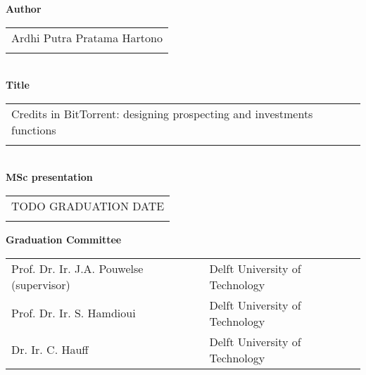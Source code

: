 \thispagestyle{empty}

\noindent \textbf{Author}\\
\begin{tabular}{l}
Ardhi Putra Pratama Hartono\\
\\
\end{tabular}\\
\noindent \textbf{Title}\\
\begin{tabular}{l}
Credits in BitTorrent: designing prospecting and investments functions\\
\\
\end{tabular}\\
\noindent \textbf{MSc presentation}\\
\begin{tabular}{l}
TODO GRADUATION DATE\\
\\
\end{tabular}

\vspace{1.1cm}

\noindent \textbf{Graduation Committee}\\
\begin{tabular}{ll}
Prof. Dr. Ir. J.A. Pouwelse (supervisor) & Delft University of Technology \\
Prof. Dr. Ir. S. Hamdioui & Delft University of Technology \\
Dr. Ir. C. Hauff & Delft University of Technology \\
\end{tabular}

